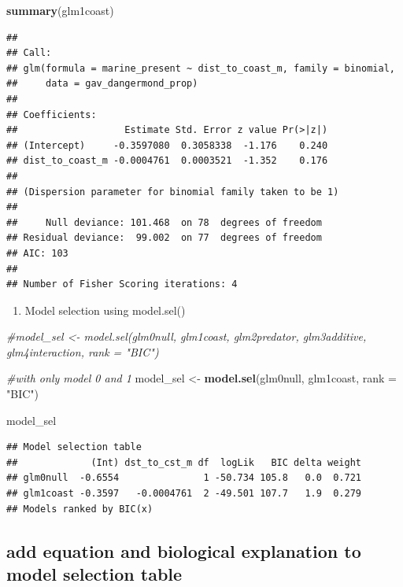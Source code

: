 \documentclass[
]{article}
\newenvironment{Shaded}{\begin{snugshade}}{\end{snugshade}}
\newcommand{\AttributeTok}[1]{\textcolor[rgb]{0.13,0.29,0.53}{#1}}
\newcommand{\CommentTok}[1]{\textcolor[rgb]{0.56,0.35,0.01}{\textit{#1}}}
\newcommand{\FunctionTok}[1]{\textcolor[rgb]{0.13,0.29,0.53}{\textbf{#1}}}
\newcommand{\NormalTok}[1]{#1}
\newcommand{\OtherTok}[1]{\textcolor[rgb]{0.56,0.35,0.01}{#1}}
\newcommand{\StringTok}[1]{\textcolor[rgb]{0.31,0.60,0.02}{#1}}
\providecommand{\tightlist}{%
  \setlength{\itemsep}{0pt}\setlength{\parskip}{0pt}}
\begin{document}
\begin{Shaded}
\begin{Highlighting}[]
\FunctionTok{summary}\NormalTok{(glm1coast)}
\end{Highlighting}
\end{Shaded}

\begin{verbatim}
## 
## Call:
## glm(formula = marine_present ~ dist_to_coast_m, family = binomial, 
##     data = gav_dangermond_prop)
## 
## Coefficients:
##                   Estimate Std. Error z value Pr(>|z|)
## (Intercept)     -0.3597080  0.3058338  -1.176    0.240
## dist_to_coast_m -0.0004761  0.0003521  -1.352    0.176
## 
## (Dispersion parameter for binomial family taken to be 1)
## 
##     Null deviance: 101.468  on 78  degrees of freedom
## Residual deviance:  99.002  on 77  degrees of freedom
## AIC: 103
## 
## Number of Fisher Scoring iterations: 4
\end{verbatim}

\begin{enumerate}
\def\labelenumi{\arabic{enumi}.}
\setcounter{enumi}{2}
\tightlist
\item
  Model selection using model.sel()
\end{enumerate}

\begin{Shaded}
\begin{Highlighting}[]
\CommentTok{\#model\_sel \textless{}{-} model.sel(glm0null, glm1coast, glm2predator, glm3additive, glm4interaction, rank = "BIC")}

\CommentTok{\#with only model 0 and 1}
\NormalTok{model\_sel }\OtherTok{\textless{}{-}} \FunctionTok{model.sel}\NormalTok{(glm0null, glm1coast, }\AttributeTok{rank =} \StringTok{"BIC"}\NormalTok{)}


\NormalTok{model\_sel}
\end{Highlighting}
\end{Shaded}

\begin{verbatim}
## Model selection table 
##             (Int) dst_to_cst_m df  logLik   BIC delta weight
## glm0null  -0.6554               1 -50.734 105.8   0.0  0.721
## glm1coast -0.3597   -0.0004761  2 -49.501 107.7   1.9  0.279
## Models ranked by BIC(x)
\end{verbatim}

\subsection{add equation and biological explanation to model selection
table}\label{add-equation-and-biological-explanation-to-model-selection-table-1}
\end{document}

